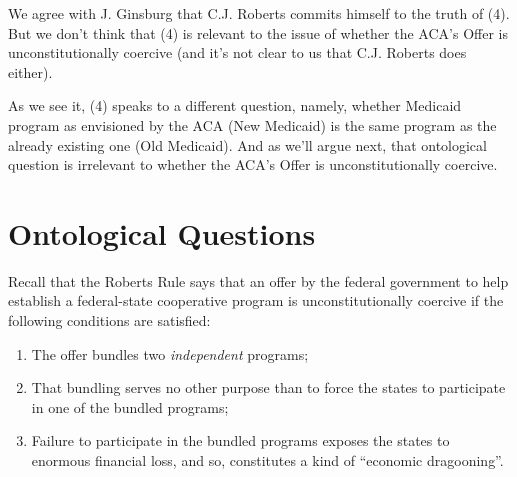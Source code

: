 \documentclass[
  11pt,
  letterpaper,
  DIV=11,
  numbers=noendperiod,
  oneside]{scrartcl}
\begin{document}
We agree with J. Ginsburg that C.J. Roberts commits himself to the truth
of (4). But we don't think that (4) is
relevant to the issue of whether the ACA's Offer is unconstitutionally
coercive (and it's not clear to us that C.J. Roberts does
either).

As we see it, (4) speaks to a different question, namely, whether
Medicaid program as envisioned by the ACA (New Medicaid) is the same
program as the already existing one (Old Medicaid). And as we'll argue
next, that ontological question is irrelevant to whether the ACA's Offer
is unconstitutionally coercive.

\section{Ontological Questions}\label{ontological-questions}

Recall that the Roberts Rule says that an offer by the federal
government to help establish a federal-state cooperative program is
unconstitutionally coercive if the following conditions are satisfied:

\begin{enumerate}
\def\labelenumi{\arabic{enumi}.}
\item
  The offer bundles two \emph{independent} programs;
\item
  That bundling serves no other purpose than to force the states to
  participate in one of the bundled programs;
\item
  Failure to participate in the bundled programs exposes the states to
  enormous financial loss, and so, constitutes a kind of ``economic
  dragooning''.
\end{enumerate}
\end{document}
